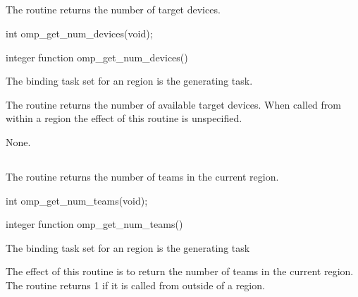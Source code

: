 \subsection{}
\label{subsec:omp_get_num_devices}
\summary
The  routine returns the number of target devices.

\format
\ccppspecificstart
\begin{boxedcode}
int omp\_get\_num\_devices(void);
\end{boxedcode}
\ccppspecificend

\fortranspecificstart
\begin{boxedcode}
integer function omp\_get\_num\_devices()
\end{boxedcode}
\fortranspecificend

\binding
The binding task set for an  region is the generating task.

\effect
The  routine returns the number of available target devices. 
When called from within a  region the effect of this routine is unspecified.

\crossreferences
None.










\subsection{}
\label{subsec:omp_get_num_teams}
\summary
The  routine returns the number of teams in the current  
region.

\pagebreak
\format
\ccppspecificstart
\begin{boxedcode}
int omp\_get\_num\_teams(void);
\end{boxedcode}
\ccppspecificend

\fortranspecificstart
\begin{boxedcode}
integer function omp\_get\_num\_teams()
\end{boxedcode}
\fortranspecificend

\binding
The binding task set for an  region is the generating task

\effect
The effect of this routine is to return the number of teams in the current  region. 
The routine returns 1 if it is called from outside of a  region.

